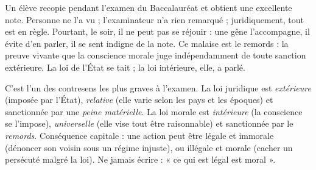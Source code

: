 \documentclass[11pt]{article}
\newcommand{\cle}[1]{{\popxbold\color{popdark}#1}}
\begin{document}
\begin{exemplebox}
Un élève recopie pendant l'examen du Baccalauréat et obtient une excellente note. Personne ne l'a vu ; l'examinateur n'a rien remarqué ; juridiquement, tout est en règle. Pourtant, le soir, il ne peut pas se réjouir : une gêne l'accompagne, il évite d'en parler, il se sent indigne de la note. Ce malaise est le \cle{remords} : la preuve vivante que la conscience morale juge indépendamment de toute sanction extérieure. La loi de l'État se tait ; la loi intérieure, elle, a parlé.
\end{exemplebox}

\begin{attention}
C'est l'un des contresens les plus graves à l'examen. La \cle{loi juridique} est \emph{extérieure} (imposée par l'État), \emph{relative} (elle varie selon les pays et les époques) et sanctionnée par une \emph{peine matérielle}. La \cle{loi morale} est \emph{intérieure} (la conscience se l'impose), \emph{universelle} (elle vise tout être raisonnable) et sanctionnée par le \emph{remords}. Conséquence capitale : une action peut être légale et immorale (dénoncer son voisin sous un régime injuste), ou illégale et morale (cacher un persécuté malgré la loi). Ne jamais écrire : « ce qui est légal est moral ».
\end{attention}
\end{document}
